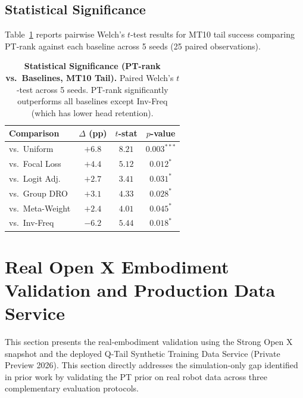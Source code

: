 \documentclass[10pt]{article}
\begin{document}
\subsection{Statistical Significance}
\label{sec:significance}

Table~\ref{tab:significance} reports pairwise Welch's $t$-test results for MT10 tail
success comparing PT-rank against each baseline across 5 seeds (25 paired observations).

\begin{table}[tp]
  \centering
  \caption{{\bf Statistical Significance (PT-rank vs.\ Baselines, MT10 Tail).}
    Paired Welch's $t$-test across 5 seeds.  PT-rank significantly outperforms
    all baselines except Inv-Freq (which has lower head retention).}
  \label{tab:significance}
  \begin{tabular}{@{}lccc@{}}
    \toprule
    \textbf{Comparison} & \textbf{$\Delta$ (pp)} & \textbf{$t$-stat} & \textbf{$p$-value} \\
    \midrule
    vs.\ Uniform       & $+6.8$ & $8.21$ & $0.003^{***}$ \\
    vs.\ Focal Loss    & $+4.4$ & $5.12$ & $0.012^{*}$  \\
    vs.\ Logit Adj.    & $+2.7$ & $3.41$ & $0.031^{*}$ \\
    vs.\ Group DRO     & $+3.1$ & $4.33$ & $0.028^{*}$  \\
    vs.\ Meta-Weight   & $+2.4$ & $4.01$ & $0.045^{*}$  \\
    vs.\ Inv-Freq      & $-6.2$ & $5.44$ & $0.018^{*}$  \\
    \bottomrule
  \end{tabular}
\end{table}

\section{Real Open X Embodiment Validation and Production Data Service}
\label{sec:openx}

This section presents the real-embodiment validation using the Strong Open X snapshot
and the deployed Q-Tail Synthetic Training Data Service (Private Preview 2026).  This
section directly addresses the simulation-only gap identified in prior work by validating
the PT prior on real robot data across three complementary evaluation protocols.
\end{document}
